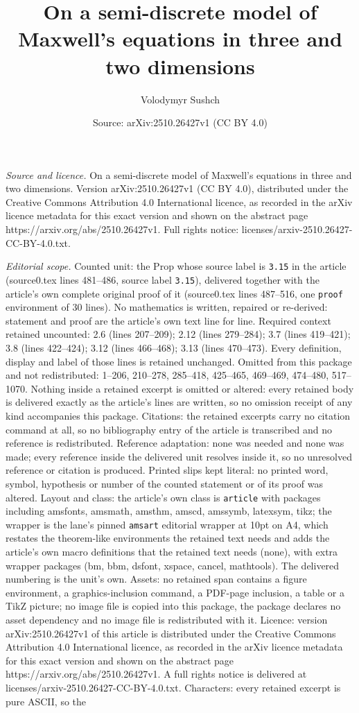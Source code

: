 \documentclass[10pt,a4paper]{amsart}
\title[On a semi-discrete model of Maxwell's equations in three and]{On a semi-discrete model of Maxwell's equations in three and two dimensions}
\author{Volodymyr Sushch}
\date{Source: arXiv:2510.26427v1 (CC BY 4.0)}
\begin{document}
\maketitle

\noindent\emph{Source and licence.} On a semi-discrete model of Maxwell's equations in three and two dimensions. Version arXiv:2510.26427v1 (CC BY 4.0), distributed under the Creative Commons Attribution 4.0 International licence, as recorded in the arXiv licence metadata for this exact version and shown on the abstract page https://arxiv.org/abs/2510.26427v1. Full rights notice: licenses/arxiv-2510.26427-CC-BY-4.0.txt.\par\smallskip

\noindent\textit{Editorial scope.} Counted unit: the Prop whose source label is \texttt{3.15} in the article (source0.tex lines 481--486, source label \texttt{3.15}), delivered together with the article's own complete original proof of it (source0.tex lines 487--516, one \texttt{proof} environment of 30 lines). No mathematics is written, repaired or re-derived: statement and proof are the article's own text line for line. Required context retained uncounted: 2.6 (lines 207--209); 2.12 (lines 279--284); 3.7 (lines 419--421); 3.8 (lines 422--424); 3.12 (lines 466--468); 3.13 (lines 470--473). Every definition, display and label of those lines is retained unchanged. Omitted from this package and not redistributed: 1--206, 210--278, 285--418, 425--465, 469--469, 474--480, 517--1070. Nothing inside a retained excerpt is omitted or altered: every retained body is delivered exactly as the article's lines are written, so no omission receipt of any kind accompanies this package. Citations: the retained excerpts carry no citation command at all, so no bibliography entry of the article is transcribed and no reference is redistributed. Reference adaptation: none was needed and none was made; every reference inside the delivered unit resolves inside it, so no unresolved reference or citation is produced. Printed slips kept literal: no printed word, symbol, hypothesis or number of the counted statement or of its proof was altered. Layout and class: the article's own class is \texttt{article} with packages including amsfonts, amsmath, amsthm, amscd, amssymb, latexsym, tikz; the wrapper is the lane's pinned \texttt{amsart} editorial wrapper at 10pt on A4, which restates the theorem-like environments the retained text needs and adds the article's own macro definitions that the retained text needs (none), with extra wrapper packages (bm, bbm, dsfont, xspace, cancel, mathtools). The delivered numbering is the unit's own. Assets: no retained span contains a figure environment, a graphics-inclusion command, a PDF-page inclusion, a table or a TikZ picture; no image file is copied into this package, the package declares no asset dependency and no image file is redistributed with it. Licence: version arXiv:2510.26427v1 of this article is distributed under the Creative Commons Attribution 4.0 International licence, as recorded in the arXiv licence metadata for this exact version and shown on the abstract page https://arxiv.org/abs/2510.26427v1. A full rights notice is delivered at licenses/arxiv-2510.26427-CC-BY-4.0.txt. Characters: every retained excerpt is pure ASCII, so the 
\end{document}
